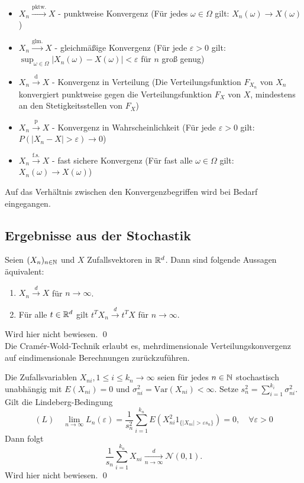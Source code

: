 \begin{itemize}
    \item $X_n \xrightarrow{\mathrm{pktw.}} X$ - punktweise Konvergenz (Für jedes $\omega \in \Omega$ gilt: $X_n(\omega) \to X(\omega)$)
    \item $X_n \xrightarrow{\mathrm{glm.}} X$ - gleichmäßige Konvergenz (Für jede $\varepsilon > 0$ gilt: $\sup_{\omega \in \Omega} |X_n(\omega) - X(\omega)| < \varepsilon$ für $n$ groß genug)
    \item $X_n \xrightarrow{\mathrm{d}} X$ - Konvergenz in Verteilung (Die Verteilungsfunktion $F_{X_n}$ von $X_n$ konvergiert punktweise gegen die Verteilungsfunktion $F_X$ von $X$, mindestens an den Stetigkeitsstellen von $F_X$)
    \item $X_n \xrightarrow{\mathrm{p}} X$ - Konvergenz in Wahrscheinlichkeit (Für jede $\varepsilon > 0$ gilt: $P(|X_n - X| > \varepsilon) \to 0$)
    \item $X_n \xrightarrow{\mathrm{f.s.}} X$ - fast sichere Konvergenz (Für fast alle $\omega \in \Omega$ gilt: $X_n(\omega) \to X(\omega)$)
\end{itemize}

Auf das Verhältnis zwischen den Konvergenzbegriffen wird bei Bedarf eingegangen.

\subsection{Ergebnisse aus der Stochastik}

\begin{satz}
Seien $(X_n)_{n \in \Bbb N}$ und $X$ Zufallsvektoren in $\Bbb R^d$. Dann sind folgende Aussagen äquivalent:
\begin{enumerate}
    \item $X_n \xrightarrow{d} X$ für $n \to \infty$.
    \item Für alle $t \in \Bbb R^d$ gilt $t^T X_n \xrightarrow{d} t^T X$ für $n \to \infty$.
\end{enumerate}
Wird hier nicht bewiesen. \qed \\
Die Cramér-Wold-Technik erlaubt es, mehrdimensionale Verteilungskonvergenz auf eindimensionale Berechnungen zurückzuführen.
\end{satz}

\begin{satz}
Die Zufallsvariablen $X_{ni}, 1 \le i \le k_n \to \infty$ seien für jedes $n \in \Bbb N$ stochastisch unabhängig mit
$E(X_{ni})=0$ und $\sigma^2_{ni} = \text{Var}(X_{ni}) \lt \infty$.
Setze $s_n^2 = \sum_{i=1}^{k_i} \sigma_{ni}^2$. Gilt die Lindeberg-Bedingung
$$(L) \quad \lim_{n \to \infty} L_n(\varepsilon) = \frac{1}{s_n^2} \sum_{i=1}^{k_n} E(X^2_{ni} 1_{\{\vert X_{ni} \vert \gt \varepsilon s_n\}})=0, \quad \forall \varepsilon \gt 0$$
Dann folgt
$$\frac{1}{s_n} \sum_{i=1}^{k_n} X_{ni} \underset{n \to \infty}{\overset d \longrightarrow} \mathcal N(0,1).$$
Wird hier nicht bewiesen. \qed
\end{satz}

